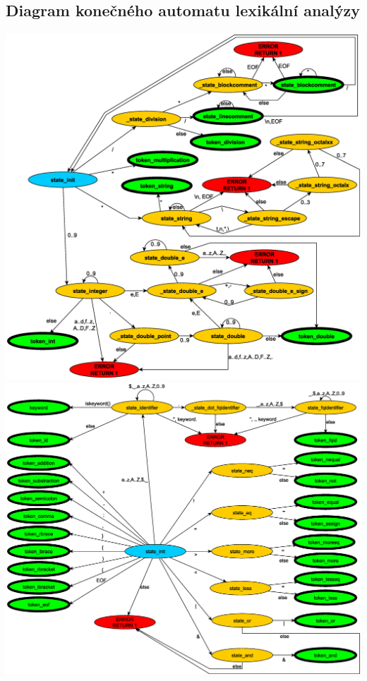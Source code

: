 \documentclass[a4paper, 11pt]{article}
\begin{document}
	\subsection{Diagram konečného automatu lexikální analýzy}\bigskip
	\begin{center}
		\includegraphics[scale=0.4]{docs/FSM_part1}\\
		\includegraphics[scale=0.4]{docs/FSM_part2}
	\end{center}
\end{document}
